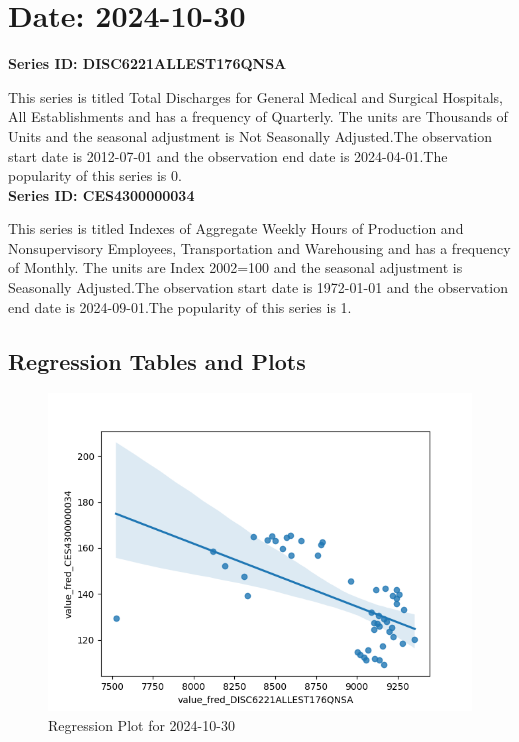 \section{Date: 2024-10-30}
\noindent \textbf{Series ID: DISC6221ALLEST176QNSA} 

\noindent This series is titled Total Discharges for General Medical and Surgical Hospitals, All Establishments and has a frequency of Quarterly. The units are Thousands of Units and the seasonal adjustment is Not Seasonally Adjusted.The observation start date is 2012-07-01 and the observation end date is 2024-04-01.The popularity of this series is 0. \\ 

\noindent \textbf{Series ID: CES4300000034} 

\noindent This series is titled Indexes of Aggregate Weekly Hours of Production and Nonsupervisory Employees, Transportation and Warehousing and has a frequency of Monthly. The units are Index 2002=100 and the seasonal adjustment is Seasonally Adjusted.The observation start date is 1972-01-01 and the observation end date is 2024-09-01.The popularity of this series is 1. \\ 

\subsection{Regression Tables and Plots}


\begin{figure}
\centering
\includegraphics[scale = 0.9]{plots/plot_2024-10-30.png}
\caption{Regression Plot for 2024-10-30}
\end{figure}
\newpage
